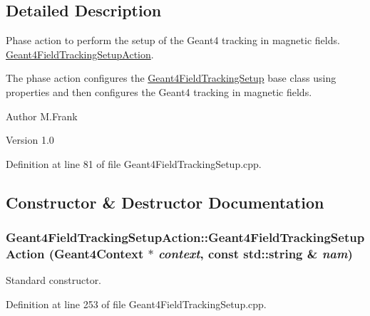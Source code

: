 \subsection{Detailed Description}
Phase action to perform the setup of the Geant4 tracking in magnetic fields. \hyperlink{class_d_d4hep_1_1_simulation_1_1_geant4_field_tracking_setup_action}{Geant4FieldTrackingSetupAction}.

The phase action configures the \hyperlink{struct_d_d4hep_1_1_simulation_1_1_geant4_field_tracking_setup}{Geant4FieldTrackingSetup} base class using properties and then configures the Geant4 tracking in magnetic fields.

\begin{DoxyAuthor}{Author}
M.Frank 
\end{DoxyAuthor}
\begin{DoxyVersion}{Version}
1.0 
\end{DoxyVersion}


Definition at line 81 of file Geant4FieldTrackingSetup.cpp.

\subsection{Constructor \& Destructor Documentation}
\hypertarget{class_d_d4hep_1_1_simulation_1_1_geant4_field_tracking_setup_action_a921208adb94ef397bd208a75a8654dcc}{
\subsubsection[{Geant4FieldTrackingSetupAction}]{\setlength{\rightskip}{0pt plus 5cm}Geant4FieldTrackingSetupAction::Geant4FieldTrackingSetupAction ({\bf Geant4Context} $\ast$ {\em context}, \/  const std::string \& {\em nam})}}
\label{class_d_d4hep_1_1_simulation_1_1_geant4_field_tracking_setup_action_a921208adb94ef397bd208a75a8654dcc}


Standard constructor. 

Definition at line 253 of file Geant4FieldTrackingSetup.cpp.

